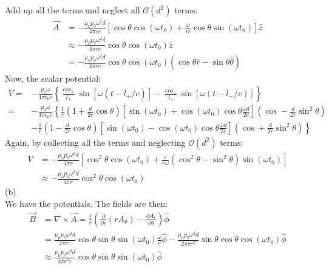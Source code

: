 \documentclass[UTF8]{ctexart}
\begin{document}
	Add up all the terms and neglect all $\mathcal{O}\left(d^{2}\right)$ terms:
	$$\begin{aligned}
	\vec{A} &=-\frac{\mu_{0} p_{0} \omega^{2} d}{4 \pi r c}\left[\cos \theta \cos \left(\omega t_{0}\right)+\frac{\omega}{r c} \cos \theta \sin \left(\omega t_{0}\right)\right] \hat{z} \\
	& \approx-\frac{\mu_{0} p_{0} \omega^{2} d}{4 \pi r c} \cos \theta \cos \left(\omega t_{0}\right) \hat{z} \\
	&=-\frac{\mu_{0} p_{0} \omega^{2} d}{4 \pi r c} \cos \theta \cos \left(\omega t_{0}\right)(\cos \theta \hat{r}-\sin \theta \hat{\theta})
	\end{aligned}$$
	Now, the scalar potential:
	$$\begin{aligned}
	V=&-\frac{p_{0} \omega}{4 \pi \epsilon_{0} c}\left\{\frac{\cos _{+}}{l_{+}} \sin \left[\omega\left(t-l_{+} / c\right)\right]-\frac{\cos _{-}}{l_{-}} \sin \left[\omega\left(t-l_{-} / c\right)\right]\right\} \\
	=&-\frac{p_{0} \omega}{4 \pi \epsilon_{0} c}\left\{\frac{1}{r}\left(1+\frac{d}{2 r} \cos \theta\right)\left[\sin \left(\omega t_{0}\right)+\cos \left(\omega t_{0}\right) \cos \theta \frac{\omega d}{2 c}\right]\left(\cos -\frac{d}{2 r} \sin ^{2} \theta\right)\right.\\
	&\left.-\frac{1}{r}\left(1-\frac{d}{2 r} \cos \theta\right)\left[\sin \left(\omega t_{0}\right)-\cos \left(\omega t_{0}\right) \cos \theta \frac{\omega d}{2 c}\right]\left(\cos +\frac{d}{2 r} \sin ^{2} \theta\right)\right\}
	\end{aligned}$$
	Again, by collecting all the terms and neglecting $\mathcal{O}\left(d^{2}\right)$ terms:
	$$\begin{aligned}
	V &=-\frac{\mu_{0} p_{0} \omega^{2} d}{4 \pi r}\left[\cos ^{2} \theta \cos \left(\omega t_{0}\right)+\frac{c}{r \omega}\left(\cos ^{2} \theta-\sin ^{2} \theta\right) \sin \left(\omega t_{0}\right)\right] \\
	& \approx-\frac{\mu_{0} p_{0} \omega^{2} d}{4 \pi r} \cos ^{2} \theta \cos \left(\omega t_{0}\right)
	\end{aligned}$$
	(b)\\
	We have the potentials. The fields are then:
	$$\begin{aligned}
	\vec{B} &=\nabla \times \vec{A}=\frac{1}{r}\left(\frac{\partial}{\partial r}\left(r A_{\theta}\right)-\frac{\partial A_{r}}{\partial \theta}\right) \hat{\phi} \\
	&=\frac{\mu_{0} p_{0} \omega^{2} d}{4 \pi c r} \cos \theta \sin \theta \sin \left(\omega t_{0}\right) \frac{\omega}{c} \hat{\phi}-\frac{\mu_{0} p_{0} \omega^{2} d}{2 \pi c r^{2}} \sin \theta \cos \theta \cos \left(\omega t_{0}\right) \hat{\phi} \\
	& \approx \frac{\mu_{0} p_{0} \omega^{3} d}{4 \pi c^{2} r} \cos \theta \sin \theta \sin \left(\omega t_{0}\right) \hat{\phi}
	\end{aligned}$$
\end{document}
